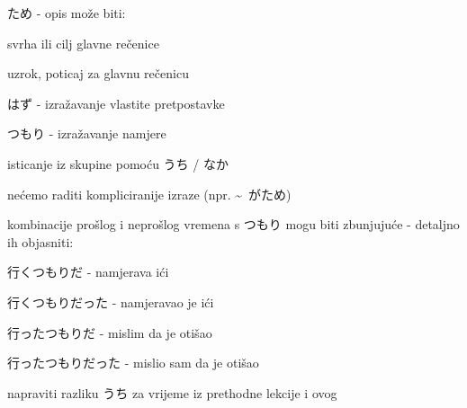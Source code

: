 
\author{Tomislav Mamić}

	
	
	\begin{hyou}
		\item ため - opis može biti:
		\begin{hyou}
			\item svrha ili cilj glavne rečenice
			\item uzrok, poticaj za glavnu rečenicu
		\end{hyou}
		\item はず - izražavanje vlastite pretpostavke
		\item つもり - izražavanje namjere
		\item isticanje iz skupine pomoću うち / なか
	\end{hyou}

	\fukudai{Napomene}
	
	\begin{hyou}
		\item nećemo raditi kompliciranije izraze (npr. \textasciitilde~がため)
		\item kombinacije prošlog i neprošlog vremena s つもり mogu biti zbunjujuće - detaljno ih objasniti:
		\begin{hyou}
			\item 行くつもりだ - namjerava ići
			\item 行くつもりだった - namjeravao je ići
			\item 行ったつもりだ - mislim da je otišao
			\item 行ったつもりだった - mislio sam da je otišao
		\end{hyou}
		\item napraviti razliku うち za vrijeme iz prethodne lekcije i ovog
	\end{hyou}
